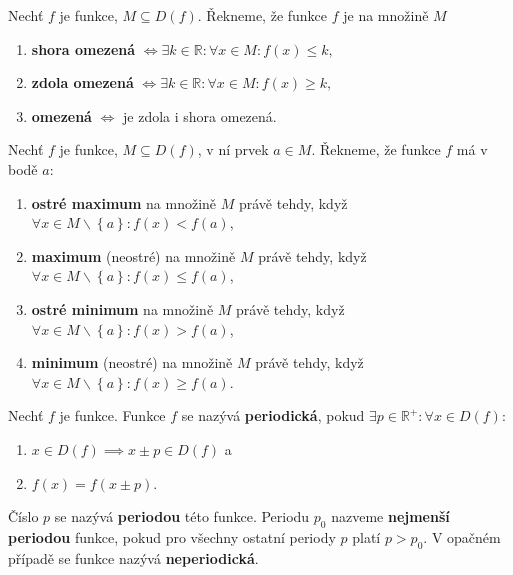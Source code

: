 \begin{definition}
  Nechť $f$ je funkce, $M\subseteq D(f)$. Řekneme, že funkce $f$ je na množině $M$
  \begin{enumerate}[$i.$]
    \item \textbf{shora omezená} $\iff \exists k \in \mathbb R: \forall x \in M: f(x)\leq k,$
    \item \textbf{zdola omezená} $\iff \exists k \in \mathbb R: \forall x \in M: f(x)\geq k,$
    \item \textbf{omezená} $\iff $ je zdola i shora omezená.
  \end{enumerate}
\end{definition}

\begin{definition}
  Nechť $f$ je funkce, $M \subseteq D(f)$, v ní prvek $a \in M$.
  Řekneme, že funkce $f$ má v bodě $a$:
  \begin{enumerate}[$i.$]
    \item \textbf{ostré maximum} na množině $M$ právě tehdy, když $\forall x \in M\smallsetminus \left \{ a \right \}  : f(x) < f(a)$,
    \item \textbf{maximum} (neostré) na množině $M$ právě tehdy, když $\forall x \in M \smallsetminus \left \{ a \right \}: f(x) \leq f(a)$,
    \item \textbf{ostré minimum} na množině $M$ právě tehdy, když $\forall x \in M\smallsetminus \left \{ a \right \}: f(x) > f(a)$,
    \item \textbf{minimum} (neostré) na množině $M$ právě tehdy, když $\forall x \in M\smallsetminus \left \{ a \right \} : f(x) \geq f(a)$.
  \end{enumerate}
\end{definition}

\begin{definition}
  Nechť $f$ je funkce. Funkce $f$ se nazývá \textbf{periodická}, pokud $\exists p \in \mathbb R^{+}: \forall x \in D(f):$
  \begin{enumerate}
    \item $x \in D(f) \implies x \pm p \in D(f)$ a
    \item $f(x) = f(x \pm p)$.
  \end{enumerate}
  Číslo $p$ se nazývá \textbf{periodou} této funkce. Periodu $p_0$ nazveme \textbf{nejmenší periodou} funkce, pokud pro všechny ostatní periody $p$ platí $p > p_0$. V opačném případě se funkce nazývá \textbf{neperiodická}.
\end{definition}

